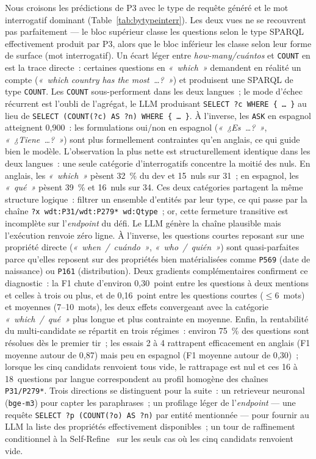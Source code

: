 \documentclass[]{ceurart}
\begin{document}
Nous croisons les prédictions de P3 avec le type de requête généré et le mot interrogatif dominant (Table~\ref{tab:bytypeinterr}). Les deux vues ne se recouvrent pas parfaitement — le bloc supérieur classe les questions selon le type SPARQL effectivement produit par P3, alors que le bloc inférieur les classe selon leur forme de surface (mot interrogatif). Un écart léger entre \emph{how-many/cuántos} et \texttt{COUNT} en est la trace directe~: certaines questions en \emph{«~which~»} demandent en réalité un compte (\emph{«~which country has the most~\ldots ?~»}) et produisent une SPARQL de type \texttt{COUNT}. Les \texttt{COUNT} sous-performent dans les deux langues~; le mode d'échec récurrent est l'oubli de l'agrégat, le LLM produisant \texttt{SELECT ?c WHERE \{~\dots~\}} au lieu de \texttt{SELECT (COUNT(?c) AS ?n) WHERE \{~\dots~\}}. À l'inverse, les \texttt{ASK} en espagnol atteignent 0{,}900~: les formulations oui/non en espagnol (\emph{«~¿Es~\ldots ?~»}, \emph{«~¿Tiene~\ldots ?~»}) sont plus formellement contraintes qu'en anglais, ce qui guide bien le modèle. L'observation la plus nette est structurellement identique dans les deux langues~: une seule catégorie d'interrogatifs concentre la moitié des nuls. En anglais, les \emph{«~which~»} pèsent 32~\% du dev et 15~nuls sur 31~; en espagnol, les \emph{«~qué~»} pèsent 39~\% et 16~nuls sur 34. Ces deux catégories partagent la même structure logique~: filtrer un ensemble d'entités par leur type, ce qui passe par la chaîne \texttt{?x wdt:P31/wdt:P279* wd:Qtype}~; or, cette fermeture transitive est incomplète sur l'\emph{endpoint} du défi. Le LLM génère la chaîne plausible mais l'exécution renvoie zéro ligne. À l'inverse, les questions courtes reposant sur une propriété directe (\emph{«~when~/~cuándo~»}, \emph{«~who~/~quién~»}) sont quasi-parfaites parce qu'elles reposent sur des propriétés bien matérialisées comme \texttt{P569} (date de naissance) ou \texttt{P161} (distribution). Deux gradients complémentaires confirment ce diagnostic~: la F1 chute d'environ 0{,}30~point entre les questions à deux mentions et celles à trois ou plus, et de 0{,}16~point entre les questions courtes ($\leq 6$~mots) et moyennes (7--10~mots), les deux effets convergeant avec la catégorie \emph{«~which~/~qué~»} plus longue et plus contrainte en moyenne. Enfin, la rentabilité du multi-candidate se répartit en trois régimes~: environ 75~\% des questions sont résolues dès le premier tir~; les essais 2 à 4 rattrapent efficacement en anglais (F1 moyenne autour de 0{,}87) mais peu en espagnol (F1 moyenne autour de 0{,}30)~; lorsque les cinq candidats renvoient tous vide, le rattrapage est nul et ces 16 à 18~questions par langue correspondent au profil homogène des chaînes \texttt{P31/P279*}. Trois directions se distinguent pour la suite~: un retrieveur neuronal (\texttt{bge-m3}) pour capter les paraphrases~; un profilage léger de l'\emph{endpoint} — une requête \texttt{SELECT ?p (COUNT(?o) AS ?n)} par entité mentionnée — pour fournir au LLM la liste des propriétés effectivement disponibles~; un tour de raffinement conditionnel à la Self-Refine~\cite{madaan2023selfrefine} sur les seuls cas où les cinq candidats renvoient vide.
\end{document}
